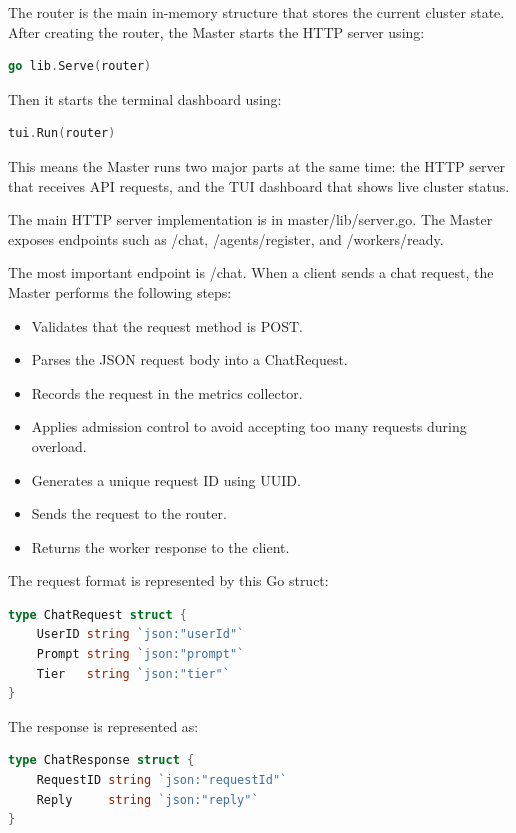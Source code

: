 The router is the main in-memory structure that stores the current cluster state. After creating the router, the Master starts the HTTP server using:

\begin{lstlisting}[language=Go]
go lib.Serve(router)
\end{lstlisting}

Then it starts the terminal dashboard using:

\begin{lstlisting}[language=Go]
tui.Run(router)
\end{lstlisting}

This means the Master runs two major parts at the same time: the HTTP server that receives API requests, and the TUI dashboard that shows live cluster status.

The main HTTP server implementation is in master/lib/server.go. The Master exposes endpoints such as /chat, /agents/register, and /workers/ready.

The most important endpoint is /chat. When a client sends a chat request, the Master performs the following steps:
\begin{itemize}[leftmargin=1.5em]
  \item Validates that the request method is POST.
  \item Parses the JSON request body into a ChatRequest.
  \item Records the request in the metrics collector.
  \item Applies admission control to avoid accepting too many requests during overload.
  \item Generates a unique request ID using UUID.
  \item Sends the request to the router.
  \item Returns the worker response to the client.
\end{itemize}

The request format is represented by this Go struct:

\begin{lstlisting}[language=Go]
type ChatRequest struct {
    UserID string `json:"userId"`
    Prompt string `json:"prompt"`
    Tier   string `json:"tier"`
}
\end{lstlisting}

The response is represented as:

\begin{lstlisting}[language=Go]
type ChatResponse struct {
    RequestID string `json:"requestId"`
    Reply     string `json:"reply"`
}
\end{lstlisting}


